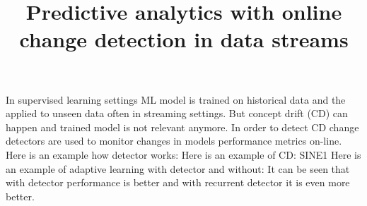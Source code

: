\documentclass[12 pt]{article}
\title{Predictive analytics with online change detection in data streams}
\date{}
\begin{document}
	\maketitle
  In supervised learning settings ML model is trained on historical data and the applied to unseen data often in streaming settings.
  But concept drift (CD) can happen and trained model is not relevant anymore.
  In order to detect CD change detectors are used to monitor changes in models performance metrics on-line. 
  Here is an example how detector works:
  Here is an example of CD: SINE1
  Here is an example of adaptive learning with detector and without:
  It can be seen that with detector performance is better and with recurrent detector it is even more better.
\end{document}
